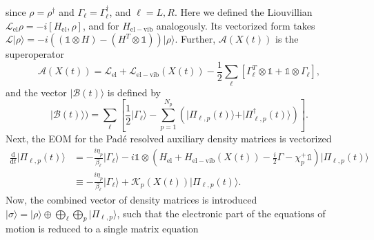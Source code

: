 \documentclass{article}
\newcommand{\dif}{\mathrm{d}}
\begin{document}
since $\rho=\rho^\dagger$ and $\Gamma_\ell = \Gamma_\ell^\dagger$, and $\ell = L,R$. Here we defined the Liouvillian $\mathcal{L}_\mathrm{el}\rho = -i[H_\mathrm{el},\rho]$, and for $H_\mathrm{el-vib}$ analogously. Its vectorized form takes $\mathcal{L}\vert \rho\rangle = -i ((\mathds{1}\otimes H)-(H^T\otimes \mathds{1}))\vert \rho\rangle$. Further, $\mathcal{A}(X(t))$ is the superoperator 
\begin{equation}
	\mathcal{A}(X(t)) = \mathcal{L}_\mathrm{el}+\mathcal{L}_\mathrm{el-vib}(X(t)) - \frac{1}{2}\sum_\ell[ \Gamma_\ell^T\otimes \mathds{1}+\mathds{1}\otimes \Gamma_\ell],
\end{equation}
and the vector $\vert \mathcal{B}(t)\rangle$ is defined by
\begin{equation*}
	\vert \mathcal{B}(t)\rangle )=\sum_\ell\left[\frac{1}{2}\vert\Gamma_\ell\rangle -  \sum_{p=1}^{N_p} \left(\vert \Pi_{\ell,p}(t)\rangle + \vert \Pi^\dagger_{\ell,p}(t)\rangle\right)\right].
\end{equation*}
Next, the EOM for the Pad\'{e} resolved auxiliary density matrices is vectorized
\begin{align}
	\frac{\dif}{\dif t}\vert \Pi_{\ell,p}(t)\rangle &= -\frac{i\eta_p}{\beta_\ell}\vert\Gamma_\ell\rangle - i\mathds{1}\otimes \left(H_\mathrm{el}+H_\mathrm{el-vib}(X(t))-\frac{i}{2} \Gamma-\chi_p^+\mathds{1}\right)\vert \Pi_{\ell,p}(t)\rangle\\
	&\equiv -\frac{i\eta_p}{\beta_\ell}\vert\Gamma_\ell\rangle + \mathcal{K}_{p}(X(t))\vert \Pi_{\ell,p}(t)\rangle.
\end{align}
Now, the combined vector of density matrices is introduced $\vert \sigma\rangle = \vert \rho\rangle \oplus \bigoplus_{\ell}\bigoplus_{p}\vert \Pi_{\ell,p}\rangle$, such that the electronic part of the equations of motion is reduced to a single matrix equation
\end{document}
